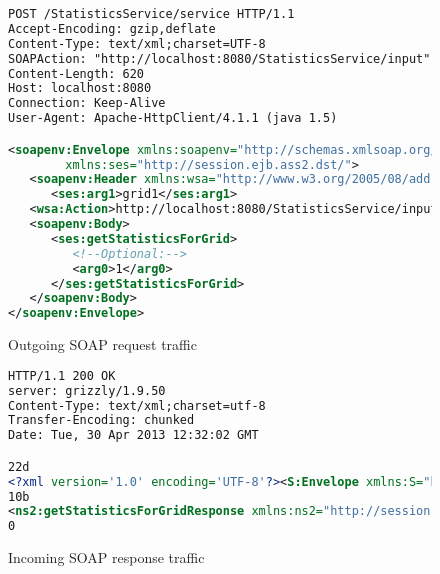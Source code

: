 \documentclass[a4paper,10pt]{article}
\begin{document}
\begin{figure}
{\small
\begin{lstlisting}[language=XML]
POST /StatisticsService/service HTTP/1.1
Accept-Encoding: gzip,deflate
Content-Type: text/xml;charset=UTF-8
SOAPAction: "http://localhost:8080/StatisticsService/input"
Content-Length: 620
Host: localhost:8080
Connection: Keep-Alive
User-Agent: Apache-HttpClient/4.1.1 (java 1.5)

<soapenv:Envelope xmlns:soapenv="http://schemas.xmlsoap.org/soap/envelope/"
        xmlns:ses="http://session.ejb.ass2.dst/">
   <soapenv:Header xmlns:wsa="http://www.w3.org/2005/08/addressing">
      <ses:arg1>grid1</ses:arg1>
   <wsa:Action>http://localhost:8080/StatisticsService/input</wsa:Action><wsa:MessageID>uuid:ccb3d231-e8ab-4e12-84a6-2f15b2d5f90c</wsa:MessageID><wsa:To>http://localhost:8080/StatisticsService/service</wsa:To></soapenv:Header>
   <soapenv:Body>
      <ses:getStatisticsForGrid>
         <!--Optional:-->
         <arg0>1</arg0>
      </ses:getStatisticsForGrid>
   </soapenv:Body>
</soapenv:Envelope>
\end{lstlisting}
}
\caption{Outgoing SOAP request traffic}
\end{figure}

\begin{figure}
{\small
\begin{lstlisting}[language=XML]
HTTP/1.1 200 OK
server: grizzly/1.9.50
Content-Type: text/xml;charset=utf-8
Transfer-Encoding: chunked
Date: Tue, 30 Apr 2013 12:32:02 GMT

22d
<?xml version='1.0' encoding='UTF-8'?><S:Envelope xmlns:S="http://schemas.xmlsoap.org/soap/envelope/"><S:Header><Action xmlns="http://www.w3.org/2005/08/addressing">http://localhost:8080/StatisticsService/output</Action><MessageID xmlns="http://www.w3.org/2005/08/addressing">uuid:dd273c77-153a-4c30-b7c4-e94ea1596ae9</MessageID><RelatesTo xmlns="http://www.w3.org/2005/08/addressing">uuid:ccb3d231-e8ab-4e12-84a6-2f15b2d5f90c</RelatesTo><To xmlns="http://www.w3.org/2005/08/addressing">http://www.w3.org/2005/08/addressing/anonymous</To></S:Header><S:Body>
10b
<ns2:getStatisticsForGridResponse xmlns:ns2="http://session.ejb.ass2.dst/"><return>&lt;?xml version="1.0" encoding="UTF-8" standalone="yes"?&gt;&lt;stats&gt;&lt;name&gt;grid1&lt;/name&gt;&lt;/stats&gt;</return></ns2:getStatisticsForGridResponse></S:Body></S:Envelope>
0
\end{lstlisting}
}
\caption{Incoming SOAP response traffic}
\end{figure}
\end{document}
